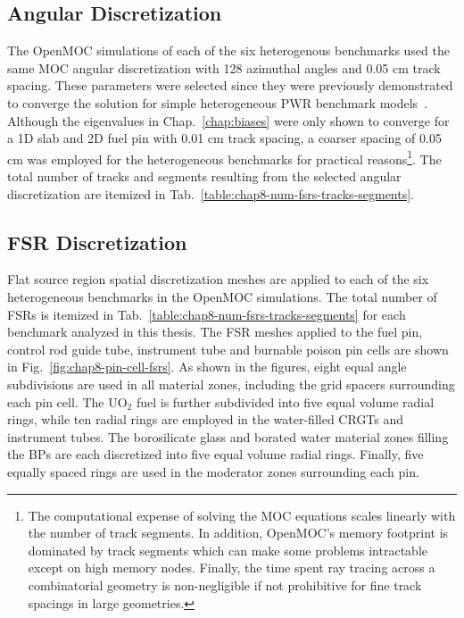 \subsection{Angular Discretization}
\label{subsec:chap8-angular-discretizations}

The OpenMOC simulations of each of the six heterogenous benchmarks used the same \ac{MOC} angular discretization with 128 azimuthal angles and 0.05 cm track spacing. These parameters were selected since they were previously demonstrated to converge the solution for simple heterogeneous \ac{PWR} benchmark models~\cite{boyd2014ms}. Although the eigenvalues in Chap.~\ref{chap:biases} were only shown to converge for a 1D slab and 2D fuel pin with 0.01 cm track spacing, a coarser spacing of 0.05 cm was employed for the heterogeneous benchmarks for practical reasons\footnote{The computational expense of solving the \ac{MOC} equations scales linearly with the number of track segments. In addition, OpenMOC's memory footprint is dominated by track segments which can make some problems intractable except on high memory nodes. Finally, the time spent ray tracing across a combinatorial geometry is non-negligible if not prohibitive for fine track spacings in large geometries.}. The total number of tracks and segments resulting from the selected angular discretization are itemized in Tab.~\ref{table:chap8-num-fsrs-tracks-segments}. 

\subsection{\ac{FSR} Discretization}
\label{subsec:chap8-fsr-discretizations}

Flat source region spatial discretization meshes are applied to each of the six heterogeneous benchmarks in the OpenMOC simulations. The total number of \ac{FSR}s is itemized in Tab.~\ref{table:chap8-num-fsrs-tracks-segments} for each benchmark analyzed in this thesis. The \ac{FSR} meshes applied to the fuel pin, control rod guide tube, instrument tube and burnable poison pin cells are shown in Fig.~\ref{fig:chap8-pin-cell-fsrs}. As shown in the figures, eight equal angle subdivisions are used in all material zones, including the grid spacers surrounding each pin cell. The UO$_2$ fuel is further subdivided into five equal volume radial rings, while ten radial rings are employed in the water-filled \acp{CRGT} and instrument tubes. The borosilicate glass and borated water material zones filling the \acp{BP} are each discretized into five equal volume radial rings. Finally, five equally spaced rings are used in the moderator zones surrounding each pin.

